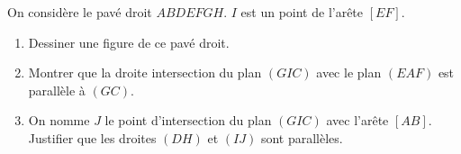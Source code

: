 
On considère le pavé droit $ABDEFGH$. 
$I$ est un point de l’arête $[EF]$. 

\begin{enumerate}
 \item Dessiner une figure de ce pavé droit.
 \item Montrer que la droite intersection du plan $(GIC)$ avec le plan $(EAF)$ est parallèle à $(GC)$. 
 \item On nomme $J$ le point d’intersection du plan $(GIC)$ avec l’arête $[AB]$. 
     Justifier que les droites $(DH)$ et $(IJ)$ sont parallèles.  
     \end{enumerate} 
